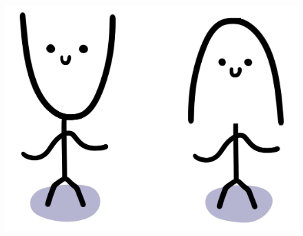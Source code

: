 \documentclass[12pt]{article}
\newcommand{\0}{x_{n}}
\newcommand{\1}{x_{n+1}}
\newcommand{\2}{x_{n+2}}
\newcommand{\3}{x_{n+3}}
\begin{document}
\begin{figure}[h]
\centering
\href{https://www.youtube.com/watch?v=AGA_1HsP_C0&ab_channel=damaziom1}{\includegraphics[scale=0.25]{parabole.png}}
\end{figure}
\end{document}
